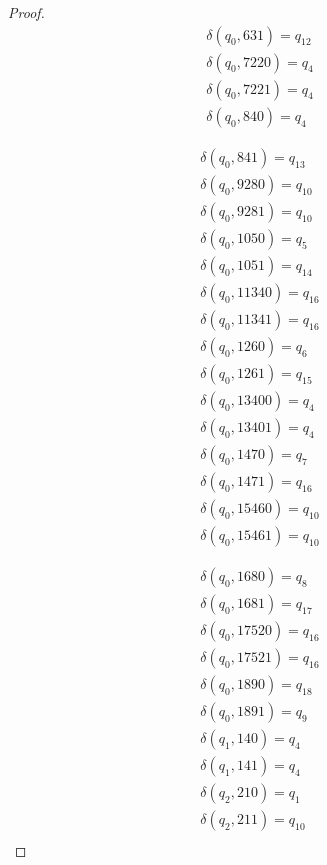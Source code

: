 \documentclass{jams-l}
\theoremstyle{definition}
\theoremstyle{remark}
\numberwithin{equation}{section}
\begin{document}
\begin{proof}
\begin{minipage}[b]{.45\textwidth}
\begin{align}
				\delta(q_{0}, 631) = q_{12}\\
				\delta(q_{0}, 7220) = q_{4}\\
				\delta(q_{0}, 7221) = q_{4}\\
				\delta(q_{0}, 840) = q_{4}
			\end{align}
		\end{minipage}
		\quad\quad\quad
		\begin{minipage}[b]{.45\textwidth}
			\begin{align}
				\delta(q_{0}, 841) = q_{13}\\
				\delta(q_{0}, 9280) = q_{10}\\
				\delta(q_{0}, 9281) = q_{10}\\
				\delta(q_{0}, 1050) = q_{5}\\
				\delta(q_{0}, 1051) = q_{14}\\
				\delta(q_{0}, 11340) = q_{16}\\
				\delta(q_{0}, 11341) = q_{16}\\
				\delta(q_{0}, 1260) = q_{6}\\
				\delta(q_{0}, 1261) = q_{15}\\
				\delta(q_{0}, 13400) = q_{4}\\
				\delta(q_{0}, 13401) = q_{4}\\
				\delta(q_{0}, 1470) = q_{7}\\
				\delta(q_{0}, 1471) = q_{16}\\
				\delta(q_{0}, 15460) = q_{10}\\
				\delta(q_{0}, 15461) = q_{10}
			\end{align}
		\end{minipage}
		\newpage
		\begin{minipage}[b]{.45\textwidth}
			\begin{align}
   				\delta(q_{0}, 1680) = q_{8}\\
   				\delta(q_{0}, 1681) = q_{17}\\
				\delta(q_{0}, 17520) = q_{16}\\
				\delta(q_{0}, 17521) = q_{16}\\
				\delta(q_{0}, 1890) = q_{18}\\
				\delta(q_{0}, 1891) = q_{9}\\
                \delta(q_{1}, 140) = q_{4}\\
				\delta(q_{1}, 141) = q_{4}\\
				\delta(q_{2}, 210) = q_{1}\\
				\delta(q_{2}, 211) = q_{10}\\

\end{align}
\end{minipage}
\end{proof}
\end{document}

